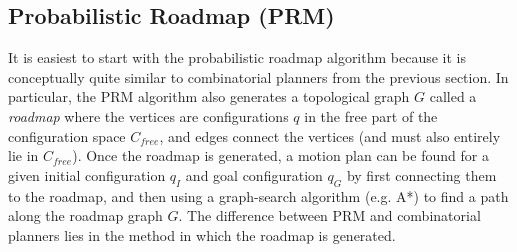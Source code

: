 \subsection{Probabilistic Roadmap (PRM)}
It is easiest to start with the probabilistic roadmap algorithm because it is conceptually quite similar to combinatorial planners from the previous section. In particular, the PRM algorithm also generates a topological graph $G$ called a \textit{roadmap} where the vertices are configurations $q$ in the free part of the configuration space $C_{free}$, and edges connect the vertices (and must also entirely lie in $C_{free}$). Once the roadmap is generated, a motion plan can be found for a given initial configuration $q_I$ and goal configuration $q_G$ by first connecting them to the roadmap, and then using a graph-search algorithm (e.g. A*) to find a path along the roadmap graph $G$. The difference between PRM and combinatorial planners lies in the method in which the roadmap is generated.

